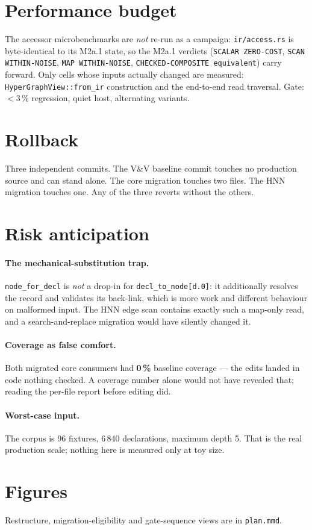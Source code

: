 \documentclass[11pt,a4paper]{article}
\newcommand{\code}[1]{\texttt{#1}}
\begin{document}
\section{Performance budget}

The accessor microbenchmarks are \emph{not} re-run as a campaign:
\code{ir/access.rs} is byte-identical to its M2a.1 state, so the M2a.1 verdicts
(\code{SCALAR ZERO-COST}, \code{SCAN WITHIN-NOISE}, \code{MAP WITHIN-NOISE},
\code{CHECKED-COMPOSITE equivalent}) carry forward. Only cells whose inputs
actually changed are measured: \code{HyperGraphView::from\_ir} construction and
the end-to-end read traversal. Gate: $<3\,\%$ regression, quiet host,
alternating variants.

\section{Rollback}

Three independent commits. The V\&V baseline commit touches no production source
and can stand alone. The core migration touches two files. The HNN migration
touches one. Any of the three reverts without the others.

\section{Risk anticipation}

\paragraph{The mechanical-substitution trap.} \code{node\_for\_decl} is
\emph{not} a drop-in for \code{decl\_to\_node[d.0]}: it additionally resolves the
record and validates its back-link, which is more work and different behaviour
on malformed input. The HNN edge scan contains exactly such a map-only read, and
a search-and-replace migration would have silently changed it.

\paragraph{Coverage as false comfort.} Both migrated core consumers had
\textbf{0\,\%} baseline coverage --- the edits landed in code nothing checked. A
coverage number alone would not have revealed that; reading the per-file report
before editing did.

\paragraph{Worst-case input.} The corpus is 96 fixtures, 6\,840 declarations,
maximum depth 5. That is the real production scale; nothing here is measured
only at toy size.

\section{Figures}



\noindent
Restructure, migration-eligibility and gate-sequence views are in
\code{plan.mmd}.
\end{document}
